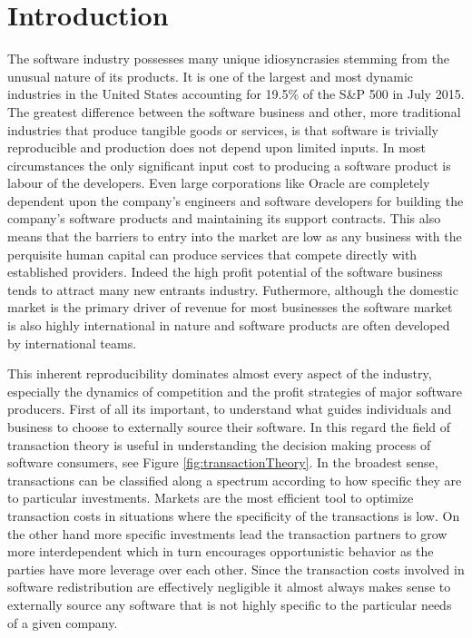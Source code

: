 \section*{Introduction}

The software industry possesses many unique idiosyncrasies stemming from the unusual nature of its products.
It is one of the largest and most dynamic industries in the United States accounting for 19.5\% of the S\&P 500 in July 2015.\autocite[6]{SurveysSoftware2015}
The greatest difference between the software business and other, more traditional industries that produce tangible goods or services, is that software is trivially reproducible and production does not depend upon limited inputs.\autocite[3]{buxmann2012software}
In most circumstances the only significant input cost to producing a software product is labour of the developers.
Even large corporations like Oracle are completely dependent upon the company's engineers and software developers for building the company's software products and maintaining its support contracts.\autocite[115]{finkle2012larry}
This also means that the barriers to entry into the market are low as any business with the perquisite human capital can produce services that compete directly with established providers.\autocite[115]{finkle2012larry}
Indeed the high profit potential of the software business tends to attract many new entrants industry.\autocite[116]{finkle2012larry}
Futhermore, although the domestic market is the primary driver of revenue for most businesses\autocite[]{ITSoftwareEconomist} the software market is also highly international in nature and software products are often developed by international teams.\autocite[3]{buxmann2012software}

This inherent reproducibility dominates almost every aspect of the industry, especially the dynamics of competition and the profit strategies of major software producers.
First of all its important, to understand what guides individuals and business to choose to externally source their software.
In this regard the field of transaction theory is useful in understanding the decision making process of software consumers, see Figure \ref{fig:transactionTheory}.
In the broadest sense, transactions can be classified along a spectrum according to how specific they are to particular investments.
Markets are the most efficient tool to optimize transaction costs in situations where the specificity of the transactions is low.
On the other hand more specific investments lead the transaction partners to grow more interdependent which in turn encourages opportunistic behavior as the parties have more leverage over each other.\autocite[44]{buxmann2012software}
Since the transaction costs involved in software redistribution are effectively negligible it almost always makes sense to externally source any software that is not highly specific to the particular needs of a given company.

